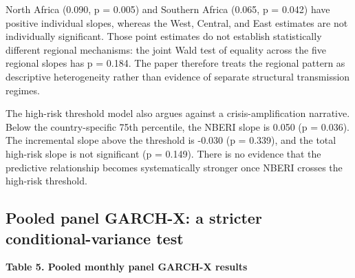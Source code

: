\documentclass[11pt]{article}
\begin{document}
North Africa (0.090, p = 0.005) and Southern Africa (0.065, p = 0.042)
have positive individual slopes, whereas the West, Central, and East
estimates are not individually significant. Those point estimates do not
establish statistically different regional mechanisms: the joint Wald
test of equality across the five regional slopes has p = 0.184. The
paper therefore treats the regional pattern as descriptive heterogeneity
rather than evidence of separate structural transmission regimes.

The high-risk threshold model also argues against a crisis-amplification
narrative. Below the country-specific 75th percentile, the NBERI slope
is 0.050 (p = 0.036). The incremental slope above the threshold is
-0.030 (p = 0.339), and the total high-risk slope is not significant (p
= 0.149). There is no evidence that the predictive relationship becomes
systematically stronger once NBERI crosses the high-risk threshold.

\subsection{Pooled panel GARCH-X: a stricter conditional-variance
test}\label{pooled-panel-garch-x-a-stricter-conditional-variance-test}

\textbf{Table 5. Pooled monthly panel GARCH-X results}
\end{document}
